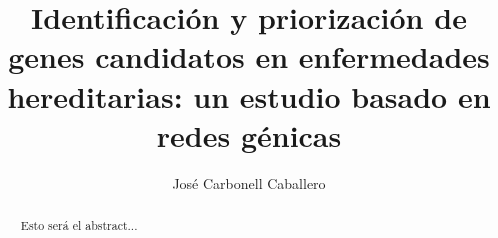 \documentclass[10pt,a4paper]{report}
\author{José Carbonell Caballero}
\title{Identificación y priorización de genes candidatos en enfermedades hereditarias: un estudio basado en redes génicas}
\begin{document}
\maketitle

\pagebreak

\begin{abstract}
Esto será el abstract...
\end{abstract}

\pagebreak

\tableofcontents

\pagebreak












\end{document}
